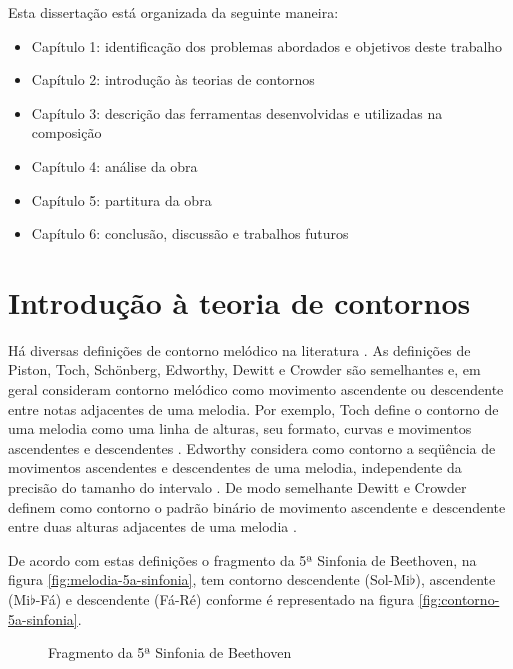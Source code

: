 Esta dissertação está organizada da seguinte maneira:

\begin{itemize}
\item Capítulo 1: identificação dos problemas abordados e objetivos
  deste trabalho
\item Capítulo 2: introdução às teorias de contornos
\item Capítulo 3: descrição das ferramentas desenvolvidas e utilizadas
  na composição
\item Capítulo 4: análise da obra \obra{}
\item Capítulo 5: partitura da obra \obra{}
\item Capítulo 6: conclusão, discussão e trabalhos futuros
\end{itemize}

\chapter{Introdução à teoria de contornos}
\label{cha:introducao-teoria-contornos}

Há diversas definições de contorno melódico na literatura
\cite{piston59:harmony,toch77:shaping,schonberg:fundamentals,adams76:melodic,edworthy85:musical,dewitt.ea86:recognition,marvin.ea87:relating,morris87:composition,clifford95:contour,beard03:contour}.
As definições de Piston, Toch, Schönberg, Edworthy, Dewitt e Crowder
são semelhantes e, em geral consideram contorno melódico como
movimento ascendente ou descendente entre notas adjacentes de uma
melodia. Por exemplo,
Toch define o contorno de uma melodia como uma linha de alturas, seu
formato, curvas e movimentos ascendentes e descendentes
\cite[p. 62]{toch77:shaping}. Edworthy considera como contorno a
seqüência de movimentos ascendentes e descendentes de uma melodia,
independente da precisão do tamanho do intervalo
\cite{edworthy85:musical}. De modo semelhante Dewitt e Crowder definem
como contorno o padrão binário de movimento ascendente e descendente
entre duas alturas adjacentes de uma melodia
\cite{dewitt.ea86:recognition}.

De acordo com estas definições o fragmento da 5ª Sinfonia de
Beethoven, na figura \ref{fig:melodia-5a-sinfonia}, tem contorno
descendente (Sol-Mi$\flat$), ascendente (Mi$\flat$-Fá) e descendente
(Fá-Ré) conforme é representado na figura
\ref{fig:contorno-5a-sinfonia}.

\begin{figure}
  \centering
  \subfloat[Contorno]{
    \texttt{[image: c-3120]}
    \label{fig:contorno-5a-sinfonia}
  }
  \caption{Fragmento da 5ª Sinfonia de Beethoven}
  \label{fig:5a-sinfonia}
\end{figure}

